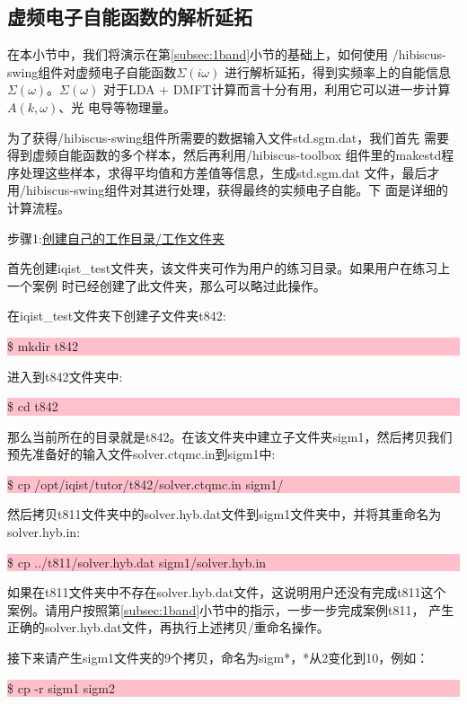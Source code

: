 \subsection{虚频电子自能函数的解析延拓}
\label{subsec:ac-s}

在本小节中，我们将演示在第\ref{subsec:1band}小节的基础上，如何使用
{\hibiscus}/hibiscus-swing组件对虚频电子自能函数$\Sigma(i\omega)$
进行解析延拓，得到实频率上的自能信息$\Sigma(\omega)$。$\Sigma(\omega)$
对于LDA + DMFT计算而言十分有用，利用它可以进一步计算$A(k,\omega)$、光
电导等物理量。

为了获得{\hibiscus}/hibiscus-swing组件所需要的数据输入文件std.sgm.dat，我们首先
需要得到虚频自能函数的多个样本，然后再利用{\hibiscus}/hibiscus-toolbox
组件里的makestd程序处理这些样本，求得平均值和方差值等信息，生成std.sgm.dat
文件，最后才用{\hibiscus}/hibiscus-swing组件对其进行处理，获得最终的实频电子自能。下
面是详细的计算流程。

步骤1:\underline{创建自己的工作目录/工作文件夹}

首先创建iqist\_test文件夹，该文件夹可作为用户的练习目录。如果用户在练习上一个案例
时已经创建了此文件夹，那么可以略过此操作。

在iqist\_test文件夹下创建子文件夹t842:

\noindent\colorbox{pink}{\parbox[r]{\linewidth}{\quad \$ mkdir t842 }}

进入到t842文件夹中:

\noindent\colorbox{pink}{\parbox[r]{\linewidth}{\quad \$ cd t842 }}

那么当前所在的目录就是t842。在该文件夹中建立子文件夹sigm1，然后拷贝我们
预先准备好的输入文件solver.ctqmc.in到sigm1中:
 
\noindent\colorbox{pink}{\parbox[r]{\linewidth}{\quad \$ cp /opt/iqist/tutor/t842/solver.ctqmc.in  sigm1/ }}

然后拷贝t811文件夹中的solver.hyb.dat文件到sigm1文件夹中，并将其重命名为
solver.hyb.in:

\noindent\colorbox{pink}{\parbox[r]{\linewidth}{\quad \$ cp ../t811/solver.hyb.dat  sigm1/solver.hyb.in }}

如果在t811文件夹中不存在solver.hyb.dat文件，这说明用户还没有完成t811这个
案例。请用户按照第\ref{subsec:1band}小节中的指示，一步一步完成案例t811，
产生正确的solver.hyb.dat文件，再执行上述拷贝/重命名操作。

接下来请产生sigm1文件夹的9个拷贝，命名为sigm*，*从2变化到10，例如：

\noindent\colorbox{pink}{\parbox[r]{\linewidth}{\quad \$ cp -r sigm1  sigm2 }}

